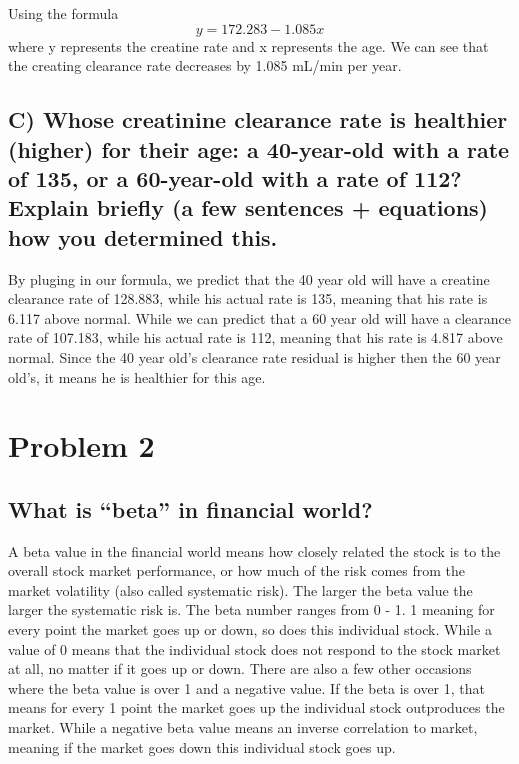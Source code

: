 \documentclass[
]{article}
\begin{document}
Using the formula \[ y = 172.283 - 1.085x \] where y represents the
creatine rate and x represents the age. We can see that the creating
clearance rate decreases by 1.085 mL/min per year.

\hypertarget{c-whose-creatinine-clearance-rate-is-healthier-higher-for-their-age-a-40-year-old-with-a-rate-of-135-or-a-60-year-old-with-a-rate-of-112-explain-briefly-a-few-sentences-equations-how-you-determined-this.}{%
\subsection{C) Whose creatinine clearance rate is healthier (higher) for
their age: a 40-year-old with a rate of 135, or a 60-year-old with a
rate of 112? Explain briefly (a few sentences + equations) how you
determined
this.}\label{c-whose-creatinine-clearance-rate-is-healthier-higher-for-their-age-a-40-year-old-with-a-rate-of-135-or-a-60-year-old-with-a-rate-of-112-explain-briefly-a-few-sentences-equations-how-you-determined-this.}}

By pluging in our formula, we predict that the 40 year old will have a
creatine clearance rate of 128.883, while his actual rate is 135,
meaning that his rate is 6.117 above normal. While we can predict that a
60 year old will have a clearance rate of 107.183, while his actual rate
is 112, meaning that his rate is 4.817 above normal. Since the 40 year
old's clearance rate residual is higher then the 60 year old's, it means
he is healthier for this age.

\hypertarget{problem-2}{%
\section{Problem 2}\label{problem-2}}

\hypertarget{what-is-beta-in-financial-world}{%
\subsection{What is ``beta'' in financial
world?}\label{what-is-beta-in-financial-world}}

A beta value in the financial world means how closely related the stock
is to the overall stock market performance, or how much of the risk
comes from the market volatility (also called systematic risk). The
larger the beta value the larger the systematic risk is. The beta number
ranges from 0 - 1. 1 meaning for every point the market goes up or down,
so does this individual stock. While a value of 0 means that the
individual stock does not respond to the stock market at all, no matter
if it goes up or down. There are also a few other occasions where the
beta value is over 1 and a negative value. If the beta is over 1, that
means for every 1 point the market goes up the individual stock
outproduces the market. While a negative beta value means an inverse
correlation to market, meaning if the market goes down this individual
stock goes up.
\end{document}
